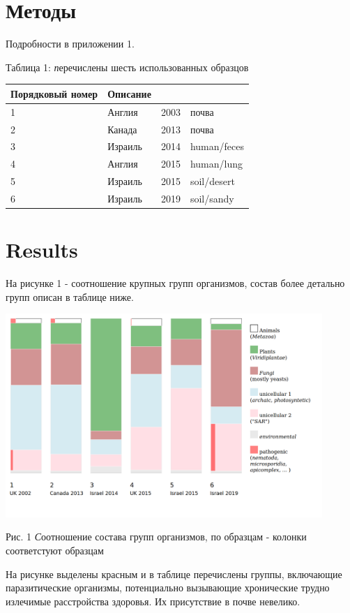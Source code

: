 \documentclass[a4paper]{article}
\begin{document}
\section{Методы}

Подробности в приложении 1.

\vskip 20pt

Таблица 1: {\textit перечислены шесть использованных образцов} 

\begin{tabular}{llll}
\hline
Порядковый номер&Описание\\
\hline
1&Англия&2003&почва\\
2&Канада&2013&почва\\
3&Израиль&2014&human/feces\\
4&Англия&2015&human/lung\\
5&Израиль&2015&soil/desert\\
6&Израиль&2019&soil/sandy\\
\hline
\end{tabular}

\section{Results}

На рисунке 1 - соотношение крупных групп организмов, состав более детально групп описан в таблице ниже.

\includegraphics[width=0.9\textwidth]{tilechart.png}

Рис. 1 {\textit Соотношение состава групп организмов, по образцам - колонки соответстуют образцам}

На рисунке выделены красным и в таблице перечислены группы, включающие паразитические организмы, потенциально вызывающие хронические трудно излечимые расстройства здоровья. Их присутствие в почве невелико.
\end{document}
